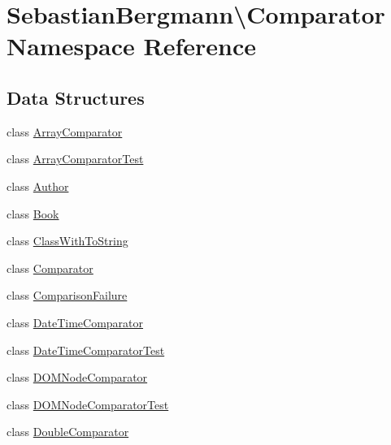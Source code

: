 \hypertarget{namespace_sebastian_bergmann_1_1_comparator}{}\section{Sebastian\+Bergmann\textbackslash{}Comparator Namespace Reference}
\label{namespace_sebastian_bergmann_1_1_comparator}
\subsection*{Data Structures}
\begin{DoxyCompactItemize}
\item 
class \mbox{\hyperlink{class_sebastian_bergmann_1_1_comparator_1_1_array_comparator}{Array\+Comparator}}
\item 
class \mbox{\hyperlink{class_sebastian_bergmann_1_1_comparator_1_1_array_comparator_test}{Array\+Comparator\+Test}}
\item 
class \mbox{\hyperlink{class_sebastian_bergmann_1_1_comparator_1_1_author}{Author}}
\item 
class \mbox{\hyperlink{class_sebastian_bergmann_1_1_comparator_1_1_book}{Book}}
\item 
class \mbox{\hyperlink{class_sebastian_bergmann_1_1_comparator_1_1_class_with_to_string}{Class\+With\+To\+String}}
\item 
class \mbox{\hyperlink{class_sebastian_bergmann_1_1_comparator_1_1_comparator}{Comparator}}
\item 
class \mbox{\hyperlink{class_sebastian_bergmann_1_1_comparator_1_1_comparison_failure}{Comparison\+Failure}}
\item 
class \mbox{\hyperlink{class_sebastian_bergmann_1_1_comparator_1_1_date_time_comparator}{Date\+Time\+Comparator}}
\item 
class \mbox{\hyperlink{class_sebastian_bergmann_1_1_comparator_1_1_date_time_comparator_test}{Date\+Time\+Comparator\+Test}}
\item 
class \mbox{\hyperlink{class_sebastian_bergmann_1_1_comparator_1_1_d_o_m_node_comparator}{D\+O\+M\+Node\+Comparator}}
\item 
class \mbox{\hyperlink{class_sebastian_bergmann_1_1_comparator_1_1_d_o_m_node_comparator_test}{D\+O\+M\+Node\+Comparator\+Test}}
\item 
class \mbox{\hyperlink{class_sebastian_bergmann_1_1_comparator_1_1_double_comparator}{Double\+Comparator}}
\item 

\end{DoxyCompactItemize}
